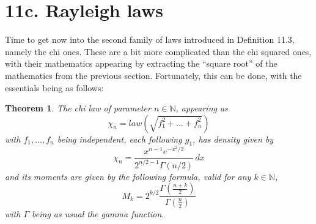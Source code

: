 \documentclass[12pt]{amsbook}
\newtheorem{theorem}{Theorem}[chapter]
\begin{document}
\section*{11c. Rayleigh laws}

Time to get now into the second family of laws introduced in Definition 11.3, namely the chi ones. These are a bit more complicated than the chi squared ones, with their mathematics appearing by extracting the ``square root'' of the mathematics from the previous section. Fortunately, this can be done, with the essentials being as follows:

\begin{theorem}
The chi law of parameter $n\in\mathbb N$, appearing as
$$\chi_n=law\left(\sqrt{f_1^2+\ldots+f_n^2}\right)$$
with $f_1,\ldots,f_n$ being independent, each following $g_1$, has density given by
$$\chi_n=\frac{x^{n-1}e^{-x^2/2}}{2^{n/2-1}\Gamma(n/2)}\,dx$$
and its moments are given by the following formula, valid for any $k\in\mathbb N$,
$$M_k=2^{k/2}\frac{\Gamma\left(\frac{n+k}{2}\right)}{\Gamma\left(\frac{n}{2}\right)}$$
with $\Gamma$ being as usual the gamma function.
\end{theorem}
\end{document}

